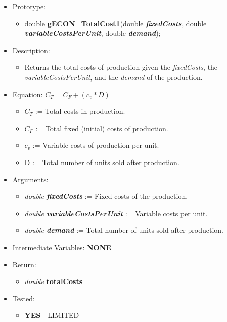 \documentclass{article}
\begin{document}
{{{{{{\begin{itemize}
\item Prototype:
	\begin{itemize}
	\item double \textbf{gECON\_TotalCost1}(double \textbf{\textit{fixedCosts}}, double \textbf{\textit{variableCostsPerUnit}}, double \textbf{\textit{demand}});
	\end{itemize}
\item Description:
	\begin{itemize}
	\item Returns the total costs of production given the \textit{fixedCosts}, the \textit{variableCostsPerUnit}, and the \textit{demand} of the production.
	\end{itemize}
\item Equation:     $C_T = C_F + ( c_v * D )$
	\begin{itemize}[noitemsep]
	\item $C_T$ := Total costs in production.
	\item $C_F$ := Total fixed (initial) costs of production.
	\item $c_v$ := Variable costs of production per unit.
	\item D := Total number of units sold after production.
	\end{itemize}
\item Arguments:
	\begin{itemize}[noitemsep]
	\item \textit{double \textbf{fixedCosts}} := Fixed costs of the production.
	\item \textit{double \textbf{variableCostsPerUnit}} := Variable costs per unit.
	\item \textit{double \textbf{demand}} := Total number of units sold after production.
	\end{itemize} 
\item Intermediate Variables: \textbf{NONE}
\item Return:
	\begin{itemize}
	\item \textit{double} \textbf{totalCosts}
	\end{itemize}
\item Tested:
	\begin{itemize}
	\item \textbf{YES} - LIMITED
	\end{itemize}
\end{itemize}

\cleardoublepage
}}}}}}
\end{document}
